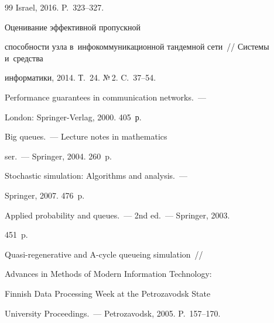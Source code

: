 {{\begin{thebibliography}{99}
Israel, 2016. P.~323--327.







 Оценивание эффективной пропускной 


способности узла в~инфокоммуникационной тандемной сети~/\!\!/ Системы и~средства 


информатики, 2014. Т.~24. №\,2. C.~37--54.








                        




 Performance guarantees in communication networks.~--- 


London: Springer-Verlag, 2000. 405~р.







 Big queues.~--- Lecture notes in mathematics


ser.~--- Springer, 2004. 260~p.







 Stochastic simulation: Algorithms and analysis.~--- 


Springer, 2007. 476~p.







 Applied probability and queues.~--- 2nd ed.~--- Springer, 2003. 


451~p.







 Quasi-regenerative and A-cycle queueing  simulation~/\!\!/ 


Advances in Methods of Modern  Information Technology:


 Finnish Data Processing Week at the Petrozavodsk State 


University Proceedings.~--- Petrozavodsk, 2005. P.~157--170.





        \end{thebibliography}


} }









